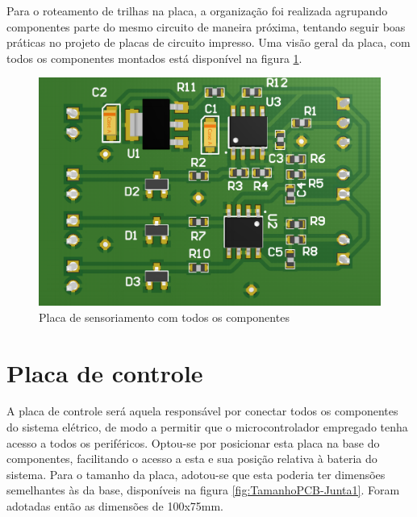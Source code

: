 
Para o roteamento de trilhas na placa, a organização foi realizada
agrupando componentes parte do mesmo circuito de maneira próxima, 
tentando seguir boas práticas no projeto de placas de circuito impresso.
Uma visão geral da placa, com todos os componentes montados está 
disponível na figura \ref{fig:Placa-sensoriamento}.

\begin{figure}[ht]
    \caption{Placa de sensoriamento com todos os componentes}    
    \begin{centering}

        \includegraphics[width=0.45\columnwidth]{images/pcbs/SensorPCB-Board.png}
    
    \par\end{centering}

    \label{fig:Placa-sensoriamento}
\end{figure}

\section{Placa de controle}

A placa de controle será aquela responsável por conectar todos os 
componentes do sistema elétrico, de modo a permitir que o 
microcontrolador empregado tenha acesso a todos os periféricos.
Optou-se por posicionar esta placa na base do componentes, facilitando 
o acesso a esta e sua posição relativa à bateria do sistema.
Para o tamanho da placa, adotou-se que esta poderia ter dimensões semelhantes
às da base, disponíveis na figura \ref{fig:TamanhoPCB-Junta1}.
Foram adotadas então as dimensões de 100x75mm.

